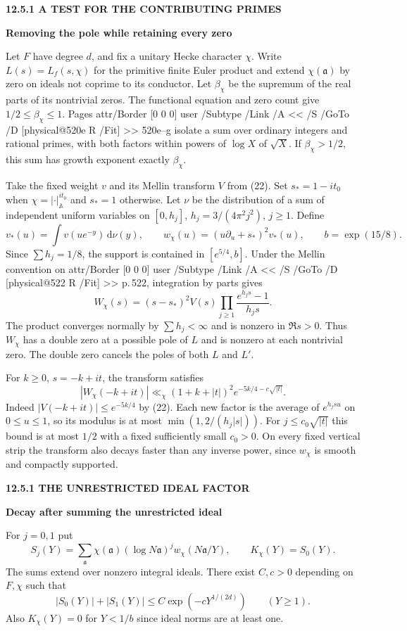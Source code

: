 \documentclass[11pt,letterpaper]{article}
\makeatletter
\newcommand{\rightmarktext}{}
\newcommand{\printfolio}{}
\newcommand{\leaf}[4]{\clearpage\gdef\printfolio{#1}\gdef\rightmarktext{#2}%
  {\small\sffamily\bfseries\color{ink}#3\par}\vspace{3pt}%
  {\LARGE\bfseries #4\par}\vspace{5pt}}
\newcommand{\A}{\mathbb A}
\newcommand{\dd}{\,\mathrm d}
\newcommand{\MusicPDFPageRef}[1]{\pdfpageref\csname physical@#1\endcsname\space\space 0 R}
\newcommand{\pagelink}[2]{\leavevmode\pdfstartlink attr{/Border [0 0 0]} user{%
  /Subtype /Link /A << /S /GoTo /D [\MusicPDFPageRef{#1} /Fit] >>}%
  {\color{ink}#2}\pdfendlink}
\newcommand{\pg}[1]{\pagelink{#1}{p.\,#1}}
\makeatother
\begin{document}
\leaf{520c}{Hecke prime sums}{12.5.1 \quad A TEST FOR THE CONTRIBUTING PRIMES}{Removing the pole while retaining every zero}
Let $F$ have degree $d$, and fix a unitary Hecke character $\chi$.
Write $L(s)=L_f(s,\chi)$ for the primitive finite Euler product and
extend $\chi(\mathfrak a)$ by zero on ideals not coprime to its conductor.
Let $\beta_\chi$ be the supremum of the real parts of its nontrivial
zeros. The functional equation and zero count give
$1/2\le\beta_\chi\le1$. Pages \pagelink{520e}{520e--g} isolate a sum
over ordinary integers and rational primes, with both factors within
powers of $\log X$ of $\sqrt X$. If $\beta_\chi>1/2$, this sum has
growth exponent exactly $\beta_\chi$.

Take the fixed weight $v$ and its Mellin transform $V$ from (22).
Set $s_*=1-it_0$ when $\chi=|\cdot|_\A^{it_0}$ and $s_*=1$
otherwise. Let $\nu$ be the distribution of a sum of independent uniform
variables on $[0,h_j]$, $h_j=3/(4\pi^2 j^2)$, $j\ge1$. Define
\[
 v_*(u)=\int v(ue^{-y})\dd\nu(y),\qquad
 w_\chi(u)=(u\partial_u+s_*)^2 v_*(u),\qquad
 b=\exp(15/8).
\]
Since $\sum h_j=1/8$, the support is contained in $[e^{5/4},b]$.
Under the Mellin convention on \pg{522}, integration by parts gives
\[
 W_\chi(s)=(s-s_*)^2 V(s)
          \prod_{j\ge1}\frac{e^{h_js}-1}{h_js}.
 \tag{20c}
\]
The product converges normally by $\sum h_j<\infty$ and is nonzero
in $\Re s>0$. Thus $W_\chi$ has a double zero at a possible pole of
$L$ and is nonzero at each nontrivial zero. The double zero cancels
the poles of both $L$ and $L'$.

For $k\ge0$, $s=-k+it$, the transform satisfies
\[
 |W_\chi(-k+it)|\ll_\chi (1+k+|t|)^2 e^{-5k/4-c\sqrt{|t|}}.
 \tag{20d}
\]
Indeed $|V(-k+it)|\le e^{-5k/4}$ by (22). Each new factor is the
average of $e^{h_jsu}$ on $0\le u\le1$, so its modulus is
at most $\min(1,2/(h_j|s|))$. For $j\le c_0\sqrt{|t|}$ this bound
is at most $1/2$ with a fixed sufficiently small $c_0>0$.
On every fixed vertical strip the transform also decays faster than
any inverse power, since $w_\chi$ is smooth and compactly supported.

\leaf{520d}{All-ideal sums}{12.5.1 \quad THE UNRESTRICTED IDEAL FACTOR}{Decay after summing the unrestricted ideal}
For $j=0,1$ put
\[
 S_j(Y)=\sum_{\mathfrak a}\chi(\mathfrak a)(\log N\mathfrak a)^j
                     w_\chi(N\mathfrak a/Y),\qquad K_\chi(Y)=S_0(Y).
\]
The sums extend over nonzero integral ideals. There exist $C,c>0$
depending on $F,\chi$ such that
\[
        |S_0(Y)|+|S_1(Y)|\le C\exp(-cY^{1/(2d)})\qquad(Y\ge1).
 \tag{20e}
\]
Also $K_\chi(Y)=0$ for $Y<1/b$ since ideal norms are at least one.
\end{document}
